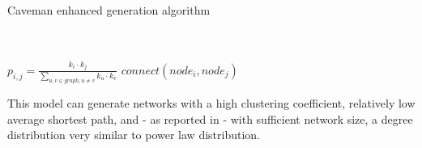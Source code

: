 \begin{algorithm}
\caption{Caveman enhanced generation algorithm}
\label{sn_ca_alg}
\begin{algorithmic}
\STATE
{}\\
\\
		\STATE $p_{i,j}=\frac{k_{i} \cdot k_{j}}{\sum_{u,v \in graph, u \neq v}{k_{u} \cdot k_{v}}}$
	 		\STATE $connect(node_{i},node_{j})$
 		\ENDIF
 	\ENDFOR
\ENDFOR
\end{algorithmic}
\end{algorithm}

This model can generate networks with a high clustering coefficient, relatively low average shortest path, and - as reported in\cite[4]{4149781} - with sufficient network size, a degree distribution very similar to power law distribution.
